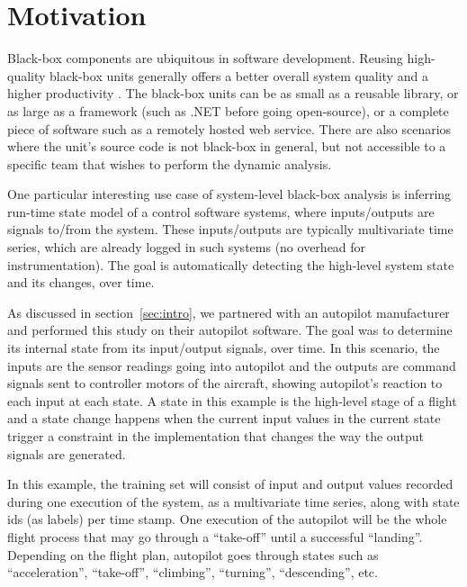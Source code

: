 \chapter{Motivation} \label{sec:motivation}
Black-box components are ubiquitous in software development. Reusing high-quality black-box units generally offers a better overall system quality and a higher productivity \cite{edwards2001framework}.  The black-box units can be as small as a reusable library, or as large as a framework (such as .NET before going open-source), or a complete piece of software such as a remotely hosted web service. There are also scenarios where the unit's source code is not black-box in general, but not accessible to a specific team that wishes to perform the dynamic analysis. 

One particular interesting use case of system-level black-box analysis is inferring run-time state model of a control software systems, where inputs/outputs are signals to/from the system. These inputs/outputs are typically multivariate time series, which are already logged in such systems (no overhead for instrumentation). The goal is automatically detecting the high-level system state and its changes, over time.

As discussed in section~\ref{sec:intro}, we partnered with an autopilot manufacturer and performed this study on their autopilot software. The goal was to determine its internal state from its input/output signals, over time. In this scenario, the inputs are the sensor readings going into autopilot and the outputs are command signals sent to controller motors of the aircraft, showing autopilot's reaction to each input at each state. A state in this example is the high-level stage of a flight and a state change happens when the current input values in the current state trigger a constraint in the implementation that changes the way the output signals are generated. %

In this example, the training set will consist of input and output values recorded during one execution of the system, as a multivariate time series, along with state ids (as labels) per time stamp. One execution of the autopilot will be the whole flight process that may go through a ``take-off'' until a successful ``landing''. Depending on the flight plan, autopilot goes through states such as ``acceleration'', ``take-off'', ``climbing'', ``turning'', ``descending'', etc. 

